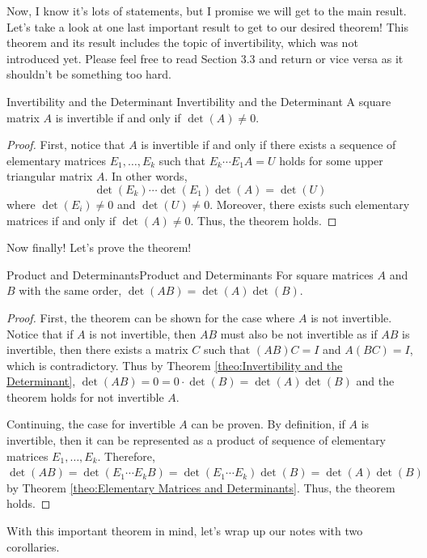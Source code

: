 \documentclass[../main.tex]{subfiles}
\begin{document}
Now, I know it's lots of statements, but I promise we will get to
the main result. Let's take a look at one last important result to
get to our desired theorem! This theorem and its result includes
the topic of invertibility, which was not introduced yet. Please
feel free to read Section 3.3 and return or vice versa as it shouldn't
be something too hard.

\begin{theorem}{Invertibility and the Determinant}
{Invertibility and the Determinant}
A square matrix $A$ is invertible if and only if $\det(A) \neq 0$.
\end{theorem}
\begin{proof}
First, notice that $A$ is invertible if and only if there exists a
sequence of elementary matrices $E_1, \ldots, E_k$ such that
$E_k \cdots E_1 A = U$ holds for some upper triangular matrix $A$.
In other words,
\[
\det(E_k) \cdots \det(E_1) \det(A) = \det(U)
\]
where $\det(E_i) \neq 0$ and $\det(U) \neq 0$. Moreover, there exists
such elementary matrices if and only if $\det(A) \neq 0$. Thus, the
theorem holds.
\end{proof}

Now finally! Let's prove the theorem!

\begin{theorem}{Product and Determinants}{Product and Determinants}
For square matrices $A$ and $B$ with the same order, $\det(AB) =
\det(A) \det(B)$.
\end{theorem}
\begin{proof}
First, the theorem can be shown for the case where $A$ is not
invertible. Notice that if $A$ is not invertible, then $AB$
must also be not invertible as if $AB$ is invertible, then
there exists a matrix $C$ such that $(AB)C = I$ and $A(BC) = I$,
which is contradictory. Thus by Theorem \ref{theo:Invertibility and
the Determinant}, $\det(AB) = 0 = 0 \cdot \det(B) = \det(A) \det(B)$
and the theorem holds for not invertible $A$.

Continuing, the case for invertible $A$ can be proven. By definition,
if $A$ is invertible, then it can be represented as a product of
sequence of elementary matrices $E_1, \ldots, E_k$. Therefore,
$\det(AB) = \det(E_1 \cdots E_k B) = \det(E_1 \cdots E_k) \det(B) =
\det(A) \det(B)$ by Theorem \ref{theo:Elementary Matrices and
Determinants}. Thus, the theorem holds.
\end{proof}

With this important theorem in mind, let's wrap up our notes with
two corollaries.
\end{document}
